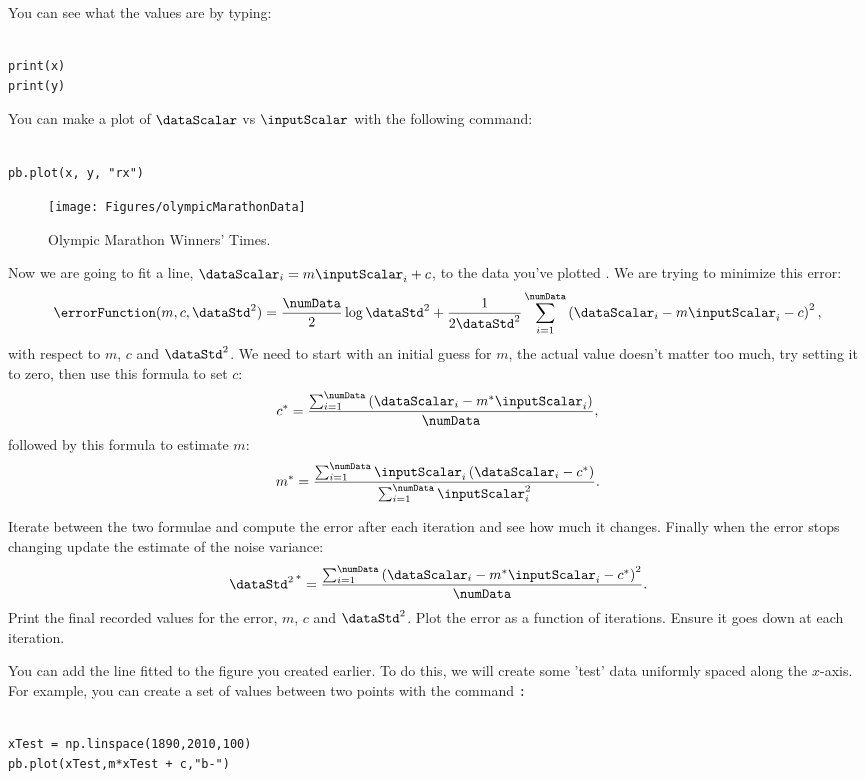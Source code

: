\documentclass{article}
\newcommand{\mintinline}[1]{\colorbox{bg}{\lstinline[basicstyle=\ttfamily]{#1}}}
\begin{document}
You can see what the values are by typing: \\ \ \\
\begin{verbatim}
print(x)
print(y)
\end{verbatim}


You can make a plot of $\dataScalar$ vs $\inputScalar$ with the following command:\\ \ \\
\begin{verbatim}
pb.plot(x, y, "rx")
\end{verbatim}
\begin{figure}[ht]
    \begin{center}
        \texttt{[image: Figures/olympicMarathonData]}
        \caption{Olympic Marathon Winners' Times.}
        \label{fig:olympics}
    \end{center}
\end{figure}


Now we are going to fit a line, $\dataScalar_i = m\inputScalar_i + c$, to the data you've plotted
. We are trying to minimize this error:
\[
\errorFunction(m,c,\dataStd ^{2})=\frac{\numData}{2}\log \dataStd^2 +\frac{1}{2\dataStd^2}\sum _{i=1}^{\numData}\left(\dataScalar_i-m\inputScalar_i-c\right)^{2},
\]
with respect to $m$, $c$ and $\dataStd^2$. We need to start with an initial
guess for $m$, the actual value doesn't matter too much, try setting it to zero,
then use this formula to set $c$:
\[
c^{*}=\frac{\sum
_{i=1}^{\numData}\left(\dataScalar_i-m^{*}\inputScalar_i\right)}{\numData},
\]
followed by this formula to estimate $m$: 
\[
m^{*}=\frac{\sum
_{i=1}^{\numData}\inputScalar_i\left(\dataScalar_i-c^{*}\right)}{\sum
_{i=1}^{\numData}\inputScalar_i^{2}}.
\]


Iterate between the two formulae and compute the error after each iteration and
see how much it changes. Finally when the error stops changing update the
estimate of the noise variance:
\[
\left.\dataStd^2\right.^{*}=\frac{\sum
_{i=1}^{\numData}\left(\dataScalar_i-m^{*}\inputScalar_i-c^{*}\right)^{2}}{\numData}.
\]
Print the final recorded values for the error, $m$, $c$ and
$\dataStd^2$. Plot the error as a function of iterations. Ensure it
goes down at each iteration.


You can add the line fitted to the figure you created earlier. To do this, we
will create some 'test' data uniformly spaced along the $x$-axis. For example,
you can create a set of values between two points with the command
\texttt:\\ \ \\
\begin{verbatim}
xTest = np.linspace(1890,2010,100)
pb.plot(xTest,m*xTest + c,"b-")
\end{verbatim}
\end{document}

